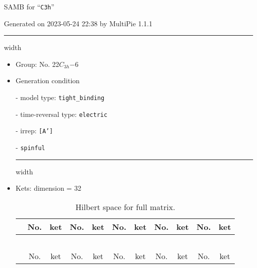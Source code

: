 \documentclass[fleqn,10pt,landscape]{article}
\begin{document}
\setcounter{MaxMatrixCols}{16}

\setlength{\baselineskip}{16pt}
\footnotesize
\begin{center}
\LARGE
SAMB for ``\texttt{C3h}''
\end{center}
\begin{flushright}
Generated on 2023-05-24 22:38 by MultiPie 1.1.1
\end{flushright}
\vspace{1cm}


 \hfil \hrule height 1mm width \textwidth \hfil

\begin{itemize}
\item Group: No. 22\quad$C_{3h}$\quad$-6$\quad[ hexagonal ]

\vspace{5mm}

\item Generation condition

\quad - model type: \texttt{tight_binding}

\quad - time-reversal type: \texttt{electric}

\quad - irrep: \texttt{[A']}

\quad - \texttt{spinful}


 \hfil \hrule height 1mm width \textwidth \hfil

\item Kets: dimension = 32
\begin{center}
\renewcommand{\arraystretch}{1.3}
\begin{longtable}{c|cc|cc|cc|cc|cc}
\caption{Hilbert space for full matrix.}
 \\
 \hline \hline
 & No. & ket & No. & ket & No. & ket & No. & ket & No. & ket \\ \hline \endfirsthead

\multicolumn{10}{l}{\tablename\ \thetable{}} \\
 \hline \hline
 & No. & ket & No. & ket & No. & ket & No. & ket & No. & ket \\ \hline \endhead


\end{longtable}
\end{center}
\end{itemize}
\end{document}
